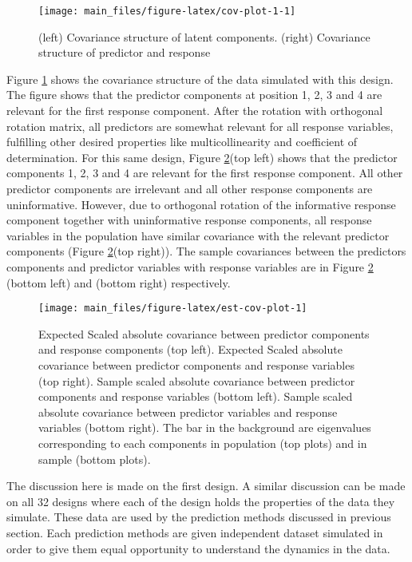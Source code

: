 \documentclass[12pt,3p,authoryear]{elsarticle}
\begin{document}
\begin{figure}
\texttt{[image: main\_files/figure-latex/cov-plot-1-1]} \caption{(left) Covariance structure of latent components. (right) Covariance structure of predictor and response}\label{fig:cov-plot-1}
\end{figure}

Figure \ref{fig:cov-plot-1} shows the covariance structure of the data
simulated with this design. The figure shows that the predictor
components at position 1, 2, 3 and 4 are relevant for the first response
component. After the rotation with orthogonal rotation matrix, all
predictors are somewhat relevant for all response variables, fulfilling
other desired properties like multicollinearity and coefficient of
determination. For this same design, Figure \ref{fig:est-cov-plot}(top
left) shows that the predictor components 1, 2, 3 and 4 are relevant for
the first response component. All other predictor components are
irrelevant and all other response components are uninformative. However,
due to orthogonal rotation of the informative response component
together with uninformative response components, all response variables
in the population have similar covariance with the relevant predictor
components (Figure \ref{fig:est-cov-plot}(top right)). The sample
covariances between the predictors components and predictor variables
with response variables are in Figure \ref{fig:est-cov-plot} (bottom
left) and (bottom right) respectively.










\begin{figure}
\texttt{[image: main\_files/figure-latex/est-cov-plot-1]} \caption{Expected Scaled absolute covariance between predictor
components and response components (top left). Expected Scaled absolute
covariance between predictor components and response variables (top
right). Sample scaled absolute covariance between predictor components
and response variables (bottom left). Sample scaled absolute covariance
between predictor variables and response variables (bottom right). The
bar in the background are eigenvalues corresponding to each components
in population (top plots) and in sample (bottom plots).}\label{fig:est-cov-plot}
\end{figure}

The discussion here is made on the first design. A similar discussion
can be made on all 32 designs where each of the design holds the
properties of the data they simulate. These data are used by the
prediction methods discussed in previous section. Each prediction
methods are given independent dataset simulated in order to give them
equal opportunity to understand the dynamics in the data.
\end{document}
